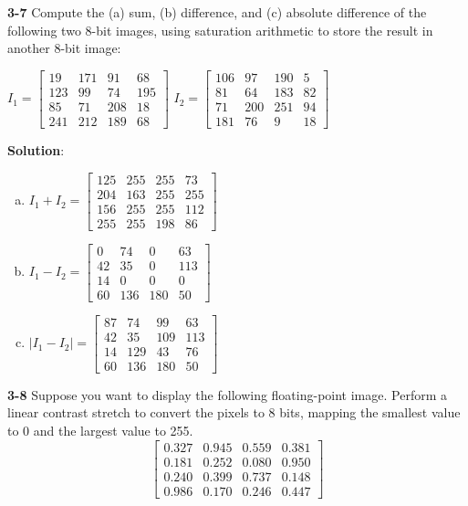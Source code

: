 \documentclass[a4paper]{article}
\begin{document}
\begin{spacing}{2.0}
	\noindent
	\textbf{3-7} Compute the (a) sum, (b) difference, and (c) absolute difference of the following two 8-bit images, using saturation arithmetic to store the result in another 8-bit image:\\
	\begin{center}
	$I_1 = \left[\begin{matrix} 19 & 171 & 91 & 68 \\ 123 & 99 & 74 & 195 \\ 85 & 71 & 208 & 18 \\ 241 & 212 & 189 & 68 \end{matrix}\right]$
	 \qquad  \qquad   \qquad
	$I_2 = \left[\begin{matrix} 106 & 97 & 190 & 5 \\ 81 & 64 & 183 & 82 \\ 71 & 200 & 251 & 94 \\ 181 & 76 & 9 & 18 \end{matrix}\right]$
	\end{center}
	
	\textbf{Solution}:
	\begin{enumerate}[(a)]
	\item $I_1 + I_2 =  \left[\begin{matrix} 125 & 255 & 255 & 73 \\ 204 & 163 & 255 & 255 \\ 156 & 255 & 255 & 112 \\ 255 & 255 & 198 & 86 \end{matrix}\right]$
	
	\item $I_1 - I_2 =  \left[\begin{matrix} 0 & 74 & 0 & 63 \\ 42 & 35 & 0 & 113 \\ 14 & 0 & 0 & 0 \\ 60 & 136 & 180 & 50 \end{matrix}\right]$
	
	\item $\left|I_1 - I_2\right| =  \left[\begin{matrix} 87 & 74 & 99& 63 \\ 42 & 35 & 109 & 113 \\ 14 & 129 & 43 & 76 \\ 60 & 136 & 180 & 50 \end{matrix}\right]$\\
	\end{enumerate}
	
	\noindent
	\textbf{3-8} Suppose you want to display the following floating-point image. Perform a linear contrast stretch to convert the pixels to 8 bits, mapping 
	the smallest value to 0 and the largest value to 255.
	$$\left[\begin{matrix} 0.327 & 0.945 & 0.559 & 0.381 \\ 0.181 & 0.252 & 0.080 & 0.950 \\ 0.240 & 0.399 & 0.737 & 0.148 \\ 0.986 & 0.170 & 0.246 & 0.447 \end{matrix}\right]$$
	

\end{spacing}
\end{document}
